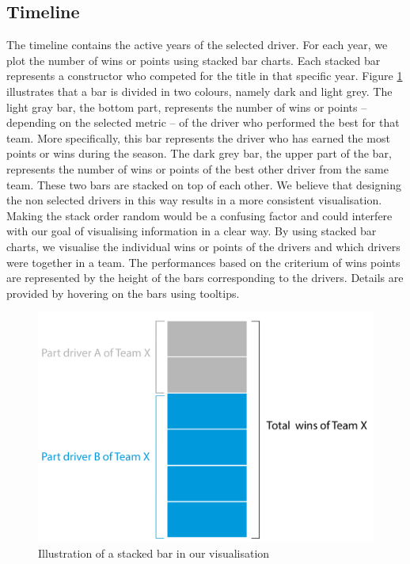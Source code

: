 \documentclass{sigchi}
\begin{document}
\subsection{Timeline}
\label{timeline}



The timeline contains the active years of the selected driver. For each year, we plot the number of wins or points using stacked bar charts. Each stacked bar represents a constructor who competed for the title in that specific year. Figure \ref{fig:stacked} illustrates that a bar is divided in two colours, namely dark and light grey. The light gray bar, the bottom part, represents the number of wins or points – depending on the selected metric –  of the driver who performed the best for that team. More specifically, this bar represents the driver who has earned the most points or wins during the season. The dark grey bar, the upper part of the bar, represents the number of wins or points of the best other driver from the same team. These two bars are stacked on top of each other. We believe that designing the non selected drivers in this way results in a more consistent visualisation. Making the stack order random would be a confusing factor and could interfere with our goal of visualising information in a clear way. By using stacked bar charts, we visualise the individual wins or points of the drivers and which drivers were together in a team. The performances based on the criterium of wins points are represented by the height of the bars corresponding to the drivers. Details are provided by hovering on the bars using tooltips.

\begin{figure}[ht]
\centering
\includegraphics[width=0.75\columnwidth]{images/stackedbar.pdf}
\caption{Illustration of a stacked bar in our visualisation}
\label{fig:stacked}
\end{figure}
 
\end{document}
